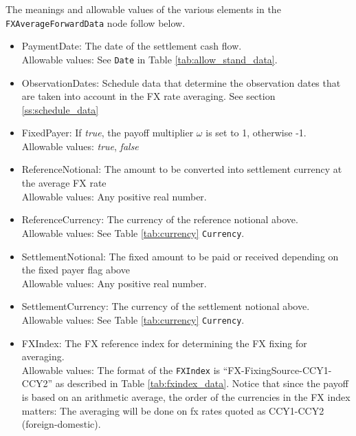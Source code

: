 The meanings and allowable values of the various elements in the \lstinline!FXAverageForwardData! node follow below.

\begin{itemize}
\item PaymentDate: The date of the settlement cash flow. \\ Allowable values:  See \lstinline!Date! in Table \ref{tab:allow_stand_data}.
\item ObservationDates: Schedule data that determine the observation dates that are taken into account in the FX rate averaging. See section \ref{ss:schedule_data}
\item FixedPayer: If  \emph{true}, the payoff multiplier $\omega$ is set to 1, otherwise -1.  \\ Allowable values:  \emph{true},  \emph{false}
\item ReferenceNotional: The amount to be converted into settlement currency at the average FX rate \\ Allowable values:  Any positive real number.
\item ReferenceCurrency: The currency of the reference notional above.  \\ Allowable values: See Table \ref{tab:currency}  \lstinline!Currency!.
\item SettlementNotional: The fixed amount to be paid or received depending on the fixed payer flag above \\ Allowable values:  Any positive real number.
\item SettlementCurrency: The currency of the settlement notional above. \\ Allowable values: See Table \ref{tab:currency}  \lstinline!Currency!.
\item FXIndex: The FX reference index for determining the FX fixing for averaging. \\
Allowable values: The format of the \lstinline!FXIndex! is ``FX-FixingSource-CCY1-CCY2'' as described in Table \ref{tab:fxindex_data}. Notice that since the payoff is based on an arithmetic average, the order of the currencies in the FX index matters: The averaging will be done on fx rates quoted as CCY1-CCY2 (foreign-domestic). 
\end{itemize}
